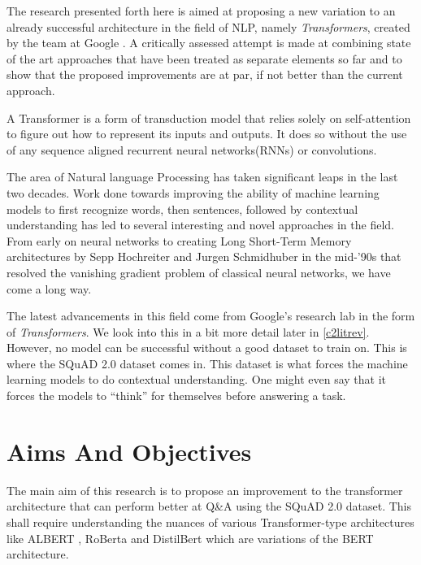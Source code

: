 \documentclass[a4paper,12pt]{report}
\begin{document}
		    The research presented forth here is aimed at proposing a new variation to an already successful architecture in the field of NLP, namely \textit{Transformers}, created by the team at Google \citep{atayl}. A critically assessed attempt is made at combining state of the art approaches that have been treated as separate elements so far and to show that the proposed improvements are at par, if not better than the current approach.

		    A Transformer is a form of transduction model that relies solely on self-attention to figure out how to represent its inputs and outputs. It does so without the use of any sequence aligned recurrent neural networks(RNNs) or convolutions.

            The area of Natural language Processing has taken significant leaps in the last two decades. Work done towards improving the ability of machine learning models to first recognize words, then sentences, followed by contextual understanding has led to several interesting and novel approaches in the field. From early on neural networks to creating Long Short-Term Memory architectures \citep{lstmoriginal} by Sepp Hochreiter and Jurgen Schmidhuber in the mid-'90s that resolved the vanishing gradient problem of classical neural networks, we have come a long way.

           The latest advancements in this field come from Google's research lab in the form of \textit{Transformers}. We look into this in a bit more detail later in \ref{c2litrev}. However, no model can be successful without a good dataset to train on. This is where the SQuAD 2.0 dataset \citep{dataset} comes in. This dataset is what forces the machine learning models to do contextual understanding. One might even say that it forces the models to ``think'' for themselves before answering a task.


        \section{Aims And Objectives}\label{12}
        	The main aim of this research is to propose an improvement to the transformer architecture that can perform better at Q\&A using the SQuAD 2.0 dataset. This shall require understanding the nuances of various Transformer-type architectures like ALBERT \citep{albert}, RoBerta \citep{roberta} and DistilBert \citep{distil} which are variations of the BERT \citep{bert} architecture.
\end{document}
